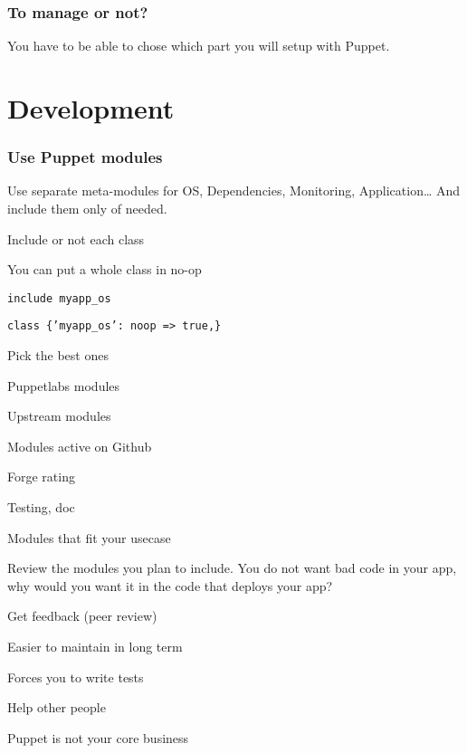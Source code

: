 \begin{frame}
    \frametitle{To manage or not?}
    \huge You have to be able to chose which part you will setup with Puppet.
\end{frame}
\section{Development}
\begin{frame}
    \frametitle{Use Puppet modules}
    \huge Use separate meta-modules for OS, Dependencies, Monitoring, Application\dots{} And include them only of needed.
\end{frame}

\begin{iframe}
\item Include or not each class
\item You can put a whole class in no-op
\item{\texttt{include myapp\_os}}
\item{\texttt{class \{'myapp\_os': noop => true,\}}}
\end{iframe}


\begin{iframe}
\item Pick the best ones
\item Puppetlabs modules
\item Upstream modules
\item Modules active on Github
\item Forge rating
\item Testing, doc
\item Modules that fit your usecase
\end{iframe}

\begin{frame}\LARGE Review the modules you plan to include. You do not want bad code in your app, why would you want it in the code that deploys your app?\end{frame}

\begin{iframe}
\item Get feedback (peer review)
\item Easier to maintain in long term
\item Forces you to write tests
\item Help other people
\item Puppet is not your core business
\end{iframe}


